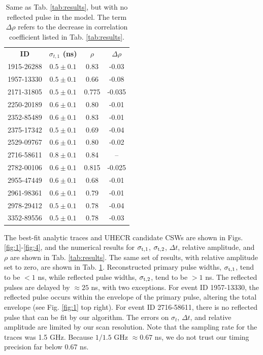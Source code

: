 \documentclass[amsmath,amssymb,aps,prd,10pt,twocolumn,showkeys]{revtex4}
\begin{document}
\begin{table}
\centering
\begin{tabular}{| c | c | c | c |}
\hline
\textbf{ID} & \textbf{$\sigma_{t,1}$ (ns)} & \textbf{$\rho$} & \textbf{$\Delta \rho$} \\
1915-26288 & $0.5\pm 0.1$ & 0.83 & -0.03 \\
1957-13330 & $0.5\pm 0.1$ & 0.66 & -0.08 \\
2171-31805 & $0.5\pm 0.1$ & 0.775 & -0.035 \\
2250-20189 & $0.6\pm 0.1$ & 0.80 & -0.01 \\
2352-85489 & $0.6\pm 0.1$ & 0.83 & -0.01 \\
2375-17342 & $0.5\pm 0.1$ & 0.69 & -0.04 \\
2529-09767 & $0.6\pm 0.1$ & 0.80 & -0.02 \\
2716-58611 & $0.8\pm 0.1$ & 0.84 & -- \\
2782-00106 & $0.6\pm 0.1$ & 0.815 & -0.025 \\
2955-47449 & $0.6\pm 0.1$ & 0.68 & -0.01 \\
2961-98361 & $0.6\pm 0.1$ & 0.79 & -0.01 \\
2978-29412 & $0.5\pm 0.1$ & 0.78 & -0.04 \\
3352-89556 & $0.5\pm 0.1$ & 0.78 & -0.03 \\
\hline
\end{tabular}
\caption{\label{tab:results2} Same as Tab. \ref{tab:results}, but with no reflected pulse in the model. The term $\Delta \rho$ refers to the decrease in correlation coefficient listed in Tab. \ref{tab:results}.}
\end{table}
\newpage 

The best-fit analytic traces and UHECR candidate CSWs are shown in Figs. \ref{fig:1}-\ref{fig:4}, and the numerical results for $\sigma_{\rm t,1}$, $\sigma_{\rm t,2}$, $\Delta t$, relative amplitude, and $\rho$ are shown in Tab. \ref{tab:results}.  The same set of results, with relative amplitude set to zero, are shown in Tab. \ref{tab:results2}.  Reconstructed primary pulse widths, $\sigma_{\rm t,1}$, tend to be $<1$ ns, while reflected pulse widths, $\sigma_{\rm t,2}$, tend to be $>1$ ns.  The reflected pulses are delayed by $\approx 25$ ns, with two exceptions.  For event ID 1957-13330, the reflected pulse occurs within the envelope of the primary pulse, altering the total envelope (see Fig. \ref{fig:1} top right).  For event ID 2716-58611, there is no reflected pulse that can be fit by our algorithm.  The errors on $\sigma_t$, $\Delta t$, and relative amplitude are limited by our scan resolution.  Note that the sampling rate for the traces was 1.5 GHz.  Because $1/1.5$ GHz $\approx 0.67$ ns, we do not trust our timing precision far below 0.67 ns.
\end{document}
